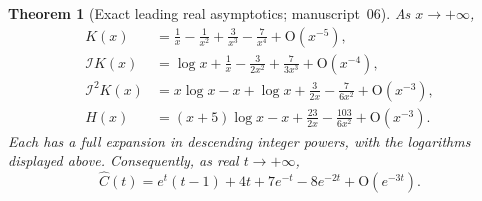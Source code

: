 \documentclass[11pt]{article}
\numberwithin{equation}{section}
\newtheorem{theorem}{Theorem}[section]
\theoremstyle{definition}
\theoremstyle{remark}
\theoremstyle{definition}
\newcommand{\bigO}{\mathrm O}
\newcommand{\bcI}{\mathcal I}
\begin{document}
\begin{theorem}[Exact leading real asymptotics; manuscript~06]
\label{spf:bc:thm:real}
As $x\to+\infty$,
\begin{align}
 K(x)&=\frac1x-\frac1{x^2}+\frac3{x^3}-\frac7{x^4}
                 +\bigO(x^{-5}),\label{spf:bc:eq:Kasym}\\
 \bcI K(x)&=\log x+\frac1x-\frac3{2x^2}
                    +\frac7{3x^3}+\bigO(x^{-4}),\label{spf:bc:eq:IKasym}\\
 \bcI^2K(x)&=x\log x-x+\log x+\frac3{2x}
                         -\frac7{6x^2}+\bigO(x^{-3}),\label{spf:bc:eq:I2Kasym}\\
 H(x)&=(x+5)\log x-x+\frac{23}{2x}-\frac{103}{6x^2}
                               +\bigO(x^{-3}).\label{spf:bc:eq:Hasym}
\end{align}
Each has a full expansion in descending integer powers, with the logarithms
displayed above. Consequently, as real $t\to+\infty$,
\begin{equation}
 \boxed{\widehat C(t)=e^t(t-1)+4t+7e^{-t}-8e^{-2t}
                                  +\bigO(e^{-3t}).}
 \label{spf:bc:eq:Basym}
\end{equation}
\end{theorem}
\end{document}
